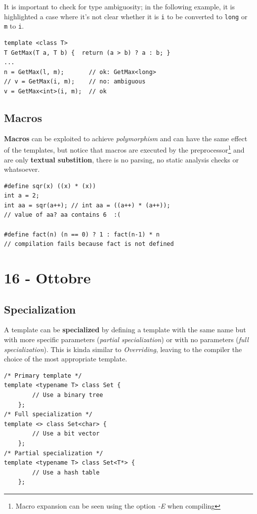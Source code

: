 It is important to check for type ambiguosity;
in the following example, it is highlighted a case where it's not clear whether it is \lstinline{i} to be converted to \lstinline{long} or \lstinline{m} to \lstinline{i}.
\begin{lstlisting}
template <class T>
T GetMax(T a, T b) {  return (a > b) ? a : b; }
...
n = GetMax(l, m);       // ok: GetMax<long>
// v = GetMax(i, m);    // no: ambiguous
v = GetMax<int>(i, m);  // ok
\end{lstlisting}

\subsection{Macros}
\textbf{Macros} can be exploited to achieve \textit{polymorphism} and can have the same effect of the templates,
but notice that macros are executed by the preprocessor\footnote{Macro expansion can be seen using the option \textit{-E} when compiling} and are only \textbf{textual substition},
there is no parsing, no static analysis checks or whatsoever.
\begin{lstlisting}
#define sqr(x) ((x) * (x))
int a = 2;
int aa = sqr(a++); // int aa = ((a++) * (a++));
// value of aa? aa contains 6  :(

#define fact(n) (n == 0) ? 1 : fact(n-1) * n
// compilation fails because fact is not defined
\end{lstlisting}

\section*{16 - Ottobre}

\subsection{Specialization}
A template can be \textbf{specialized} by defining a template with the same name but with more specific parameters (\textit{partial specialization}) or with no parameters (\textit{full specialization}).
This is kinda similar to \textit{Overriding},
leaving to the compiler the choice of the most appropriate template.

\begin{lstlisting}
/* Primary template */
template <typename T> class Set {
        // Use a binary tree
    };
/* Full specialization */
template <> class Set<char> {
        // Use a bit vector
    };
/* Partial specialization */
template <typename T> class Set<T*> {
        // Use a hash table
    };
\end{lstlisting}

